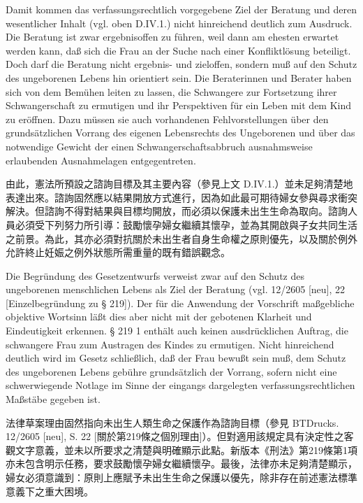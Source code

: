 \documentclass[12pt]{article}
\begin{document}
\begin{sourcepara}[title={原文E.178}]
Damit kommen das verfassungsrechtlich vorgegebene Ziel der Beratung und deren wesentlicher Inhalt (vgl. oben D.IV.1.) nicht hinreichend deutlich zum Ausdruck. Die Beratung ist zwar ergebnisoffen zu führen, weil dann am ehesten erwartet werden kann, daß sich die Frau an der Suche nach einer Konfliktlösung beteiligt. Doch darf die Beratung nicht ergebnis- und zieloffen, sondern muß auf den Schutz des ungeborenen Lebens hin orientiert sein. Die Beraterinnen und Berater haben sich von dem Bemühen leiten zu lassen, die Schwangere zur Fortsetzung ihrer Schwangerschaft zu ermutigen und ihr Perspektiven für ein Leben mit dem Kind zu eröffnen. Dazu müssen sie auch vorhandenen Fehlvorstellungen über den grundsätzlichen Vorrang des eigenen Lebensrechts des Ungeborenen und über das notwendige Gewicht der einen Schwangerschaftsabbruch ausnahmsweise erlaubenden Ausnahmelagen entgegentreten.
\end{sourcepara}
\begin{transpara}
由此，憲法所預設之諮詢目標及其主要內容（參見上文 D.IV.1.）並未足夠清楚地表達出來。諮詢固然應以結果開放方式進行，因為如此最可期待婦女參與尋求衝突解決。但諮詢不得對結果與目標均開放，而必須以保護未出生生命為取向。諮詢人員必須受下列努力所引導：鼓勵懷孕婦女繼續其懷孕，並為其開啟與子女共同生活之前景。為此，其亦必須對抗關於未出生者自身生命權之原則優先，以及關於例外允許終止妊娠之例外狀態所需重量的既有錯誤觀念。
\end{transpara}

\begin{sourcepara}[title={原文E.179}]
Die Begründung des Gesetzentwurfs verweist zwar auf den Schutz des ungeborenen menschlichen Lebens als Ziel der Beratung (vgl. \abbrBTDrucks{} 12/2605 [neu], \abbrS{} 22 [Einzelbegründung zu § 219]). Der für die Anwendung der Vorschrift maßgebliche objektive Wortsinn läßt dies aber nicht mit der gebotenen Klarheit und Eindeutigkeit erkennen. § 219 \abbrAbs{} 1 \abbrStGB{} \abbrNF{} enthält auch keinen ausdrücklichen Auftrag, die schwangere Frau zum Austragen des Kindes zu ermutigen. Nicht hinreichend deutlich wird im Gesetz schließlich, daß der Frau bewußt sein muß, dem Schutz des ungeborenen Lebens gebühre grundsätzlich der Vorrang, sofern nicht eine schwerwiegende Notlage im Sinne der eingangs dargelegten verfassungsrechtlichen Maßstäbe gegeben ist.
\end{sourcepara}
\begin{transpara}
法律草案理由固然指向未出生人類生命之保護作為諮詢目標（參見 BTDrucks. 12/2605 [neu], S. 22 [關於第219條之個別理由]）。但對適用該規定具有決定性之客觀文字意義，並未以所要求之清楚與明確顯示此點。新版本《刑法》第219條第1項亦未包含明示任務，要求鼓勵懷孕婦女繼續懷孕。最後，法律亦未足夠清楚顯示，婦女必須意識到：原則上應賦予未出生生命之保護以優先，除非存在前述憲法標準意義下之重大困境。
\end{transpara}
\end{document}
